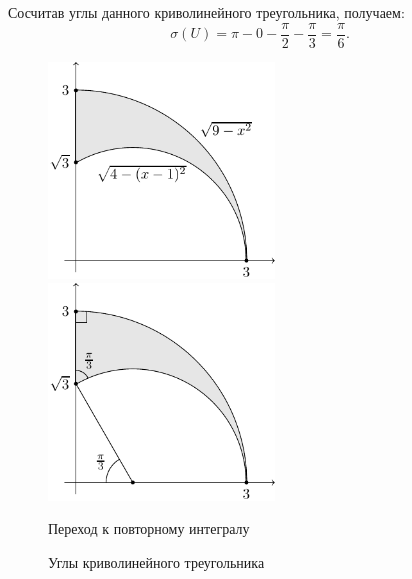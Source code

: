 \begin{secondsolution}
	Сосчитав углы данного криволинейного треугольника, получаем:
	\[
		\sigma(U) = \pi - 0 - \frac{\pi}{2} - \frac{\pi}{3} = \frac{\pi}{6}.
	\]
\end{secondsolution}


\begin{figure}[H]
	\centering
	\begin{minipage}{.4\textwidth}
		\centering
		\includegraphics[width=6cm]{./img/CurveTriangle.pdf}
	\end{minipage}
	\hspace{1cm}
	\begin{minipage}{.4\textwidth}
		\centering
		\includegraphics[width=6cm]{./img/CurveAngles.pdf}
	\end{minipage}
	\vspace{.3cm}

	\begin{minipage}{.4\textwidth}
		\centering
		Переход к повторному интегралу
	\end{minipage}
	\hspace{1cm}
	\begin{minipage}{.4\textwidth}
		\centering
		Углы криволинейного треугольника
	\end{minipage}
	
	\caption[format=empty]{}
\end{figure}

